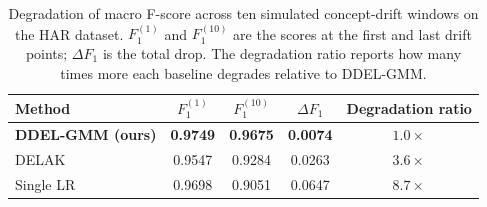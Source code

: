 \begin{table}[htbp]
	\begin{center}
		\caption{Degradation of macro F-score across ten simulated concept-drift windows on the HAR dataset. $F_1^{(1)}$ and $F_1^{(10)}$ are the scores at the first and last drift points; $\Delta F_1$ is the total drop. The degradation ratio reports how many times more each baseline degrades relative to DDEL-GMM.}
		\label{tab:concept_drift}
		\setlength{\tabcolsep}{3pt}
		\begin{tabular}{|l|c|c|c|c|}
			\hline
			\textbf{Method} & \textbf{$F_1^{(1)}$} & \textbf{$F_1^{(10)}$} & \textbf{$\Delta F_1$} & \textbf{Degradation ratio} \\
			\hline
			\textbf{DDEL-GMM (ours)} & \textbf{0.9749} & \textbf{0.9675} & \textbf{0.0074} & $1.0\times$ \\
			DELAK & 0.9547 & 0.9284 & 0.0263 & $3.6\times$ \\
			Single LR & 0.9698 & 0.9051 & 0.0647 & $8.7\times$ \\
			\hline
		\end{tabular}
	\end{center}
\end{table}
